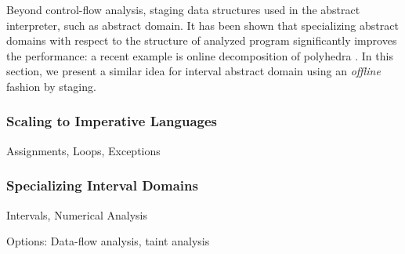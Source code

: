 Beyond control-flow analysis, staging data structures used in the abstract interpreter, such as abstract domain.
It has been shown that specializing abstract domains with respect to the structure of analyzed program significantly 
improves the performance: a recent example is online decomposition of polyhedra \cite{DBLP:conf/popl/SinghPV17}.
In this section, we present a similar idea for interval abstract domain using an \textit{offline} fashion by staging.

\subsubsection{Scaling to Imperative Languages}

Assignments, Loops, Exceptions

\subsubsection{Specializing Interval Domains}

Intervals, Numerical Analysis

Options: Data-flow analysis, taint analysis
